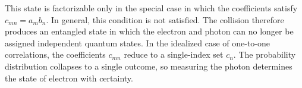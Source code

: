 This state is factorizable only in the special case in which the coefficients satisfy $c_{mn}=a_m b_n$. In general, this condition is not satisfied. The collision therefore produces an entangled state in which the electron and photon can no longer be assigned independent quantum states. In the idealized case of one-to-one correlations, the coefficients $c_{mn}$ reduce to a single-index set $c_n$.  The probability distribution collapses to a single outcome, so measuring the photon determines the state of electron with certainty.










%

%


 
